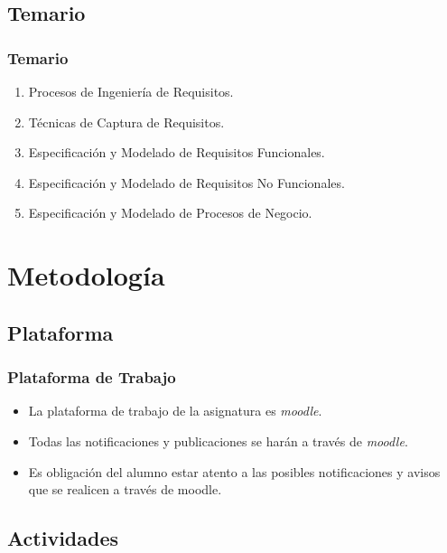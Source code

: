 \documentclass[handout,a4paper,slidestop,xcolor=pst,dvips,blue]{beamer}
\begin{document}
\subsection{Temario}

\begin{frame}[c]
	\frametitle{Temario}
	\begin{enumerate}[<+->]
		\item Procesos de Ingeniería de Requisitos.
		\item Técnicas de Captura de Requisitos.
		\item Especificación y Modelado de Requisitos Funcionales.
		\item Especificación y Modelado de Requisitos No Funcionales.
		\item Especificación y Modelado de Procesos de Negocio.
	\end{enumerate}
\end{frame}

\section{Metodología}

\subsection{Plataforma}

\begin{frame}[c]
	\frametitle{Plataforma de Trabajo}
	\begin{itemize}
		\item<1-> La plataforma de trabajo de la asignatura es \emph{moodle}.
		\item<2-> Todas las notificaciones y publicaciones se harán a través de \emph{moodle}.
		\item<3-> \alert{Es obligación del alumno estar atento a las posibles notificaciones y avisos que se realicen a través de moodle}.
	\end{itemize}
\end{frame}

\subsection{Actividades}
\end{document}
